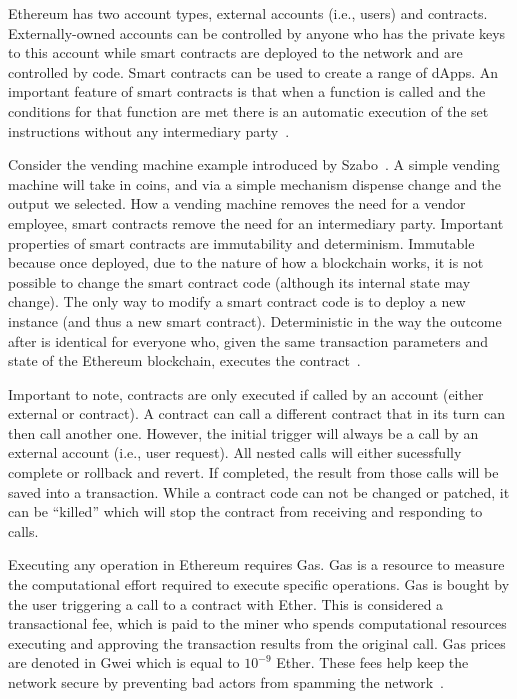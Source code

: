 \documentclass[10pt,conference]{IEEEtran}
\begin{document}
Ethereum has two account types,  external accounts (i.e., users) and contracts. Externally-owned accounts can be controlled by anyone who has the private keys to this account while smart contracts are deployed to the network and are controlled by code.
Smart contracts can be used to create a range of dApps.  An important feature of smart contracts is that when a function is called and the conditions for that function are met there is an automatic execution of the set instructions without any intermediary party~\cite{ethereum, white_paper}.

Consider the vending machine example introduced by Szabo~\cite{nick}. A simple vending machine will take in coins, and via a simple mechanism dispense change and the output we selected. How a vending machine removes the need for a vendor employee, smart contracts remove the need for an intermediary party. Important properties of smart contracts are immutability and determinism. Immutable because once deployed, due to the nature of how a blockchain works, it is not possible to change the smart contract code (although its internal state may change). The only way to modify a smart contract code is to deploy a new instance (and thus a new smart contract). Deterministic in the way the outcome after is identical for everyone who, given the same transaction parameters and state of the Ethereum blockchain, executes the contract~\cite{white_paper}.

Important to note, contracts are only executed if called by an account (either external or contract). A contract can call a different contract that in its turn can then call another one. However, the initial trigger will always be a call by an external account (i.e., user request). All nested calls will either sucessfully complete or rollback and revert. If completed, the result from those calls will be saved into a transaction. While a contract code can not be changed or patched, it can be ``killed'' which will stop the contract from receiving and responding to calls.

Executing any operation in Ethereum requires Gas. Gas is a resource to measure the computational effort required to execute specific operations. Gas is bought by the user triggering a call to a contract with Ether. This is considered a transactional fee, which is paid to the miner who spends computational resources executing and approving the transaction results from the original call. Gas prices are denoted in Gwei which is equal to $10^{-9}$ Ether. These fees help keep the network secure by preventing bad actors from spamming the network~\cite{docs}.
\end{document}
